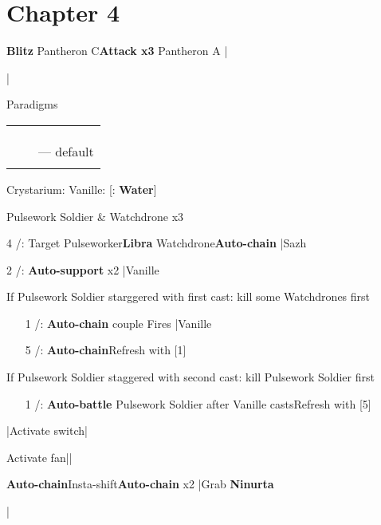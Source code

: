 \section{Chapter 4}
\begin{mainlist}
	\item {}
	\item {} \textbf{Blitz} Pantheron C\to \textbf{Attack x3} Pantheron A |\skip
	\item {}|
\end{mainlist}
\begin{menu}
	\item Paradigms
	\begin{tabular}{ccl}
		\rav&\rav&\\
		\syn&\sab&\\
		\rav&\med&\\
		\rav&\newrole{\sab}&--- default\\
		\newrole{\rav}&\rav&
	\end{tabular}
	\item Crystarium: Vanille: [\rav: \textbf{Water}]
\end{menu}
\begin{fight}{Pulsework Soldier \& Watchdrone x3}
	\item [4] \rav/\sab: Target Pulseworker\to \textbf{Libra} Watchdrone\to \textbf{Auto-chain} |Sazh
	\item [2] \syn/\sab: \textbf{Auto-support} x2 |Vanille
	\item If Pulsework Soldier starggered with first cast: kill some Watchdrones first
	\begin{itemize}
		\item [1] \rav/\rav: \textbf{Auto-chain} couple Fires |Vanille
		\item [5] \rav/\rav: \textbf{Auto-chain}\to Refresh with [1]
	\end{itemize}
	\item If Pulsework Soldier staggered with second cast: kill Pulsework Soldier first
	\begin{itemize}
		\item [1] \rav/\rav: \textbf{Auto-battle} Pulsework Soldier after Vanille casts\to Refresh with [5]
	\end{itemize}
	\item |Activate switch|\skip
\end{fight}
\begin{mainlist}
	\item Activate fan|\skip|
	\item {} \textbf{Auto-chain}\to [4] Insta-shift\to [1] \textbf{Auto-chain} x2 |Grab \textbf{Ninurta}
	\item \skip|\skip
\end{mainlist}

